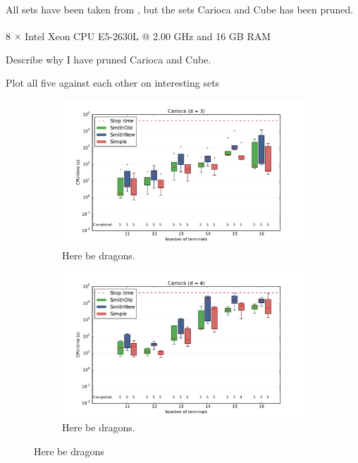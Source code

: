 All sets have been taken from \textcite{fonseca2014}, but the sets Carioca and
Cube has been pruned.

8 $\times$ Intel\textsuperscript{\textregistered}
Xeon\textsuperscript{\textregistered} CPU E5-2630L @ 2.00 GHz and 16 GB RAM

Describe why I have pruned Carioca and Cube.

Plot all five against each other on interesting sets

\begin{figure}[htbp]
  \centering
  \begin{subfigure}[t]{0.5\textwidth}
    \includegraphics[width=\textwidth]{gfx/boxplots/plot_nvst_boxplot_d3_Carioca_1}
  \caption{Here be dragons.\label{fig:boxplot-d3-carioca-1}}
  \end{subfigure}%
  \begin{subfigure}[t]{0.5\textwidth}
    \includegraphics[width=\textwidth]{gfx/boxplots/plot_nvst_boxplot_d4_Carioca_1}
  \caption{Here be dragons.\label{fig:boxplot-d3-carioca-1}}
  \end{subfigure}%
  \caption[Here be dragons]{Here be dragons\label{fig:boxplot-carioca-1}}
\end{figure}

